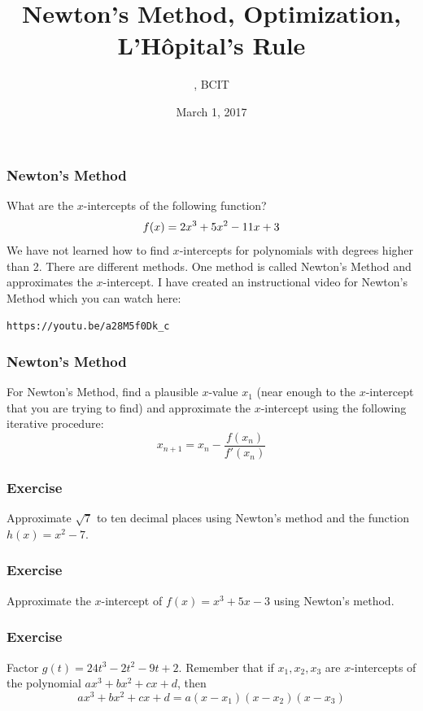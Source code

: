 \documentclass[xcolor=dvipsnames]{beamer}
\title{Newton's Method, Optimization, L'H{\^o}pital's Rule}
\subtitle{{\CourseNumber}, BCIT}
\author{\CourseName}
\date{March 1, 2017}
\begin{document}
\begin{frame}
  \titlepage
\end{frame}


\begin{frame}
  \frametitle{Newton's Method}
What are the $x$-intercepts of the following function?
\begin{equation}
  \label{eq:ietaicie}
f(x)=2x^{3}+5x^{2}-11x+3\notag
\end{equation}
We have not learned how to find $x$-intercepts for polynomials with
degrees higher than 2. There are different methods. One method is
called \alert{Newton's Method} and approximates the $x$-intercept. I
have created an instructional video for Newton's Method which you can
watch here:
\begin{alltt}
https://youtu.be/a28M5f0Dk\_c
\end{alltt}
\end{frame}

\begin{frame}
  \frametitle{Newton's Method}
For Newton's Method, find a plausible $x$-value $x_{1}$ (near enough
to the $x$-intercept that you are trying to find) and approximate the
$x$-intercept using the following iterative procedure:
\begin{equation}
  \label{eq:heimioje}
  x_{n+1}=x_{n}-\frac{f(x_{n})}{f'(x_{n})}
\end{equation}
\end{frame}

\begin{frame}
  \frametitle{Exercise}
{\ubung} Approximate $\sqrt{7}$ to ten decimal places using Newton's
  method and the function $h(x)=x^{2}-7$. 
\end{frame}

\begin{frame}
  \frametitle{Exercise}
{\ubung} Approximate the $x$-intercept of $f(x)=x^{3}+5x-3$ using
  Newton's method. %
\end{frame}

\begin{frame}
  \frametitle{Exercise}
{\ubung} Factor $g(t)=24t^{3}-2t^{2}-9t+2$. Remember that if $x_{1},x_{2},x_{3}$ 
  are $x$-intercepts of the polynomial $ax^{3}+bx^{2}+cx+d$, then
  \begin{equation}
    \label{eq:ahsuagha}
    ax^{3}+bx^{2}+cx+d=a(x-x_{1})(x-x_{2})(x-x_{3})
  \end{equation}
\end{frame}
\end{document}
